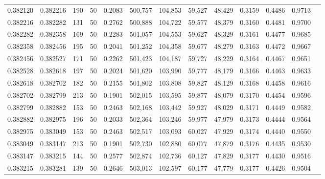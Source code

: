 \begin{tabular}{rrrrrrrrrrrrr}
0.382120 & 0.382216 &   190 &  50 &                                     0.2083 & 500,757 & 104,853 &  59,527 &  48,429 & 0.3159 & 0.4486 & 0.9713 \\
0.382216 & 0.382282 &   131 &  50 &                                     0.2762 & 500,888 & 104,722 &  59,577 &  48,379 & 0.3160 & 0.4481 & 0.9700 \\
0.382282 & 0.382358 &   169 &  50 &                                     0.2283 & 501,057 & 104,553 &  59,627 &  48,329 & 0.3161 & 0.4477 & 0.9685 \\
0.382358 & 0.382456 &   195 &  50 &                                     0.2041 & 501,252 & 104,358 &  59,677 &  48,279 & 0.3163 & 0.4472 & 0.9667 \\
0.382456 & 0.382527 &   171 &  50 &                                     0.2262 & 501,423 & 104,187 &  59,727 &  48,229 & 0.3164 & 0.4467 & 0.9651 \\
0.382528 & 0.382618 &   197 &  50 &                                     0.2024 & 501,620 & 103,990 &  59,777 &  48,179 & 0.3166 & 0.4463 & 0.9633 \\
0.382618 & 0.382702 &   182 &  50 &                                     0.2155 & 501,802 & 103,808 &  59,827 &  48,129 & 0.3168 & 0.4458 & 0.9616 \\
0.382702 & 0.382799 &   213 &  50 &                                     0.1901 & 502,015 & 103,595 &  59,877 &  48,079 & 0.3170 & 0.4454 & 0.9596 \\
0.382799 & 0.382882 &   153 &  50 &                                     0.2463 & 502,168 & 103,442 &  59,927 &  48,029 & 0.3171 & 0.4449 & 0.9582 \\
0.382882 & 0.382975 &   196 &  50 &                                     0.2033 & 502,364 & 103,246 &  59,977 &  47,979 & 0.3173 & 0.4444 & 0.9564 \\
0.382975 & 0.383049 &   153 &  50 &                                     0.2463 & 502,517 & 103,093 &  60,027 &  47,929 & 0.3174 & 0.4440 & 0.9550 \\
0.383049 & 0.383147 &   213 &  50 &                                     0.1901 & 502,730 & 102,880 &  60,077 &  47,879 & 0.3176 & 0.4435 & 0.9530 \\
0.383147 & 0.383215 &   144 &  50 &                                     0.2577 & 502,874 & 102,736 &  60,127 &  47,829 & 0.3177 & 0.4430 & 0.9516 \\
0.383215 & 0.383281 &   139 &  50 &                                     0.2646 & 503,013 & 102,597 &  60,177 &  47,779 & 0.3177 & 0.4426 & 0.9504 \\

\end{tabular}
